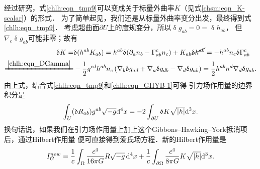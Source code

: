 经过研究，式\eqref{chlh:eqn_tmp9}可以变成关于标量外曲率$K$（见式\eqref{chsm:eqn_K-scalar}）的形式．
为了简单起见，我们还是从标量外曲率变分出发，最终得到式\eqref{chlh:eqn_tmp9}．
考虑超曲面$\partial U$上的度规变分，所以$\updelta g_{ab}=0=\updelta h_{ab}$，
但$\nabla_c\updelta g_{ab}$可能非零；故有
\begin{equation}
\begin{aligned}
    \updelta K =& \updelta (h^{ab} K_{ab})
    =h^{ab} \updelta (\partial_a n_b - \Gamma^c_{ab} n_c)
      + K_{ab} \cancel{\updelta h^{ab}}
    =-h^{ab} n_c \updelta \Gamma^c_{ab} \\
    \xlongequal{\ref{chlh:eqn_DGamma}}&
    -\frac{1}{2} g^{cd} h^{ab} n_c\left(  \nabla_b \updelta g_{ad}
    + \nabla_a \updelta g_{db} - \nabla_d \updelta g_{ab} \right)
    = \frac{1}{2} h^{ab} n^d \nabla_d \updelta g_{ab} .
\end{aligned}
\end{equation}
由上式，结合式\eqref{chlh:eqn_tmp9}和\eqref{chlh:eqn_GHYB-1}可得
引力场作用量的边界积分是
\begin{equation}\label{chlh:eqn_GHYB}
   \int_U (\updelta R_{ab}) g^{ab} \sqrt{-g} {\rm d}^{4}x
        =  -2\int_{\partial U} \updelta K   \sqrt{|h|} {\rm d}^{3}x .
\end{equation}
换句话说，如果我们在引力场作用量上加上这个Gibbons--Hawking--York抵消项后，通过Hilbert作用量
便可直接得到爱氏场方程．新的Hilbert作用量是
\begin{equation}\label{chlh:eqn_I-G-new}
    I_G^{new} =  \frac{1}{c} \int_\Omega \frac{c^4}{16\pi G} R\sqrt{-g}\,{\rm d}^{4}x
     +\frac{1}{c} \int_{\partial \Omega} \frac{c^4}{8\pi G} K   \sqrt{|h|} {\rm d}^{3}x  .
\end{equation}


%

   





